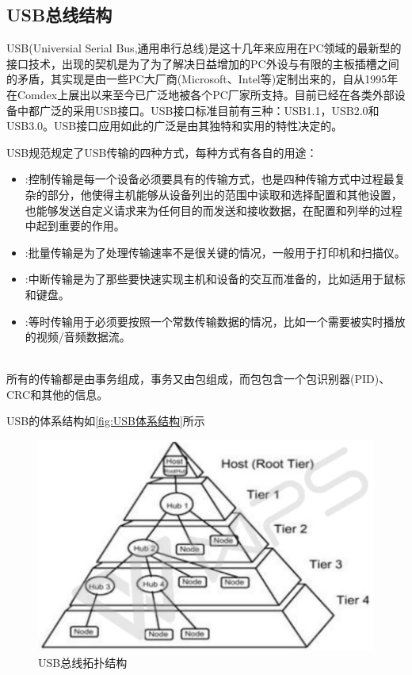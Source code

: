 \subsection{USB总线结构}
	USB(Universial Serial Bus,通用串行总线)是这十几年来应用在PC领域的最新型的接口技术，出现的契机是为了为了解决日益增加的PC外设与有限的主板插槽之间的矛盾，其实现是由一些PC大厂商(Microsoft、Intel等)定制出来的，自从1995年在Comdex上展出以来至今已广泛地被各个PC厂家所支持。目前已经在各类外部设备中都广泛的采用USB接口。USB接口标准目前有三种：USB1.1，USB2.0和USB3.0。USB接口应用如此的广泛是由其独特和实用的特性决定的。

\noindent USB规范规定了USB传输的四种方式，每种方式有各自的用途\cite{USB总线接口开发指南}：
\begin{itemize}
\item {}:控制传输是每一个设备必须要具有的传输方式，也是四种传输方式中过程最复杂的部分，他使得主机能够从设备列出的范围中读取和选择配置和其他设置，也能够发送自定义请求来为任何目的而发送和接收数据，在配置和列举的过程中起到重要的作用。
\item {}:批量传输是为了处理传输速率不是很关键的情况，一般用于打印机和扫描仪。
\item {}:中断传输是为了那些要快速实现主机和设备的交互而准备的，比如适用于鼠标和键盘。
\item {}:等时传输用于必须要按照一个常数传输数据的情况，比如一个需要被实时播放的视频/音频数据流。
\end{itemize}\\
所有的传输都是由事务组成，事务又由包组成，而包包含一个包识别器(PID)、CRC和其他的信息\cite{USB大全}。

	USB的体系结构如\autoref{fig:USB体系结构}所示
\begin{figure}[!h]
\centering
\includegraphics[width=1.0\textwidth]{./graphics/usb-structure.pdf}
\caption{USB总线拓扑结构}\label{fig:USB体系结构}
\end{figure}

